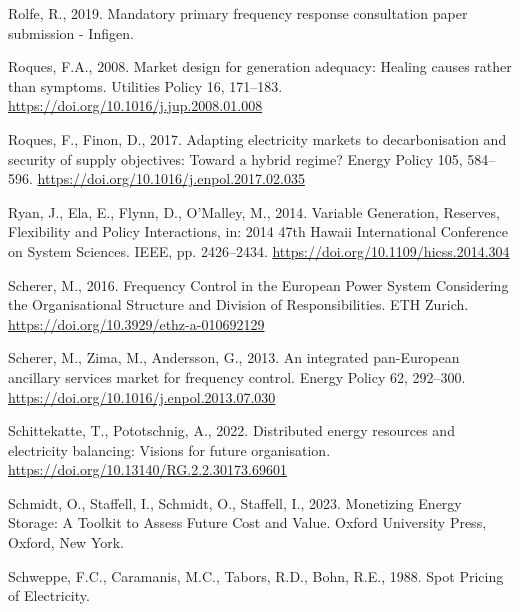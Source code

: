 \documentclass[12pt,a4paper,]{report}
\newlength{\cslhangindent}
\newenvironment{CSLReferences}[2] %
 {%
  \setlength{\parindent}{0pt}
  \ifodd #1 \everypar{\setlength{\hangindent}{\cslhangindent}}\ignorespaces\fi
  \ifnum #2 > 0
  \setlength{\parskip}{#2\baselineskip}
  \fi
 }%
 {}
\begin{document}
\begin{CSLReferences}{1}{0}
\leavevmode{}%
Rolfe, R., 2019. Mandatory primary frequency response consultation paper
submission - {Infigen}.

\leavevmode{}%
Roques, F.A., 2008. Market design for generation adequacy: {Healing}
causes rather than symptoms. Utilities Policy 16, 171--183.
\url{https://doi.org/10.1016/j.jup.2008.01.008}

\leavevmode{}%
Roques, F., Finon, D., 2017. Adapting electricity markets to
decarbonisation and security of supply objectives: {Toward} a hybrid
regime? Energy Policy 105, 584--596.
\url{https://doi.org/10.1016/j.enpol.2017.02.035}

\leavevmode{}%
Ryan, J., Ela, E., Flynn, D., O'Malley, M., 2014. Variable {Generation},
{Reserves}, {Flexibility} and {Policy Interactions}, in: 2014 47th
{Hawaii International Conference} on {System Sciences}. {IEEE}, pp.
2426--2434. \url{https://doi.org/10.1109/hicss.2014.304}

\leavevmode{}%
Scherer, M., 2016. Frequency {Control} in the {European Power System
Considering} the {Organisational Structure} and {Division} of
{Responsibilities}. {ETH Zurich}.
\url{https://doi.org/10.3929/ethz-a-010692129}

\leavevmode{}%
Scherer, M., Zima, M., Andersson, G., 2013. An integrated pan-{European}
ancillary services market for frequency control. Energy Policy 62,
292--300. \url{https://doi.org/10.1016/j.enpol.2013.07.030}

\leavevmode{}%
Schittekatte, T., Pototschnig, A., 2022. Distributed energy resources
and electricity balancing: Visions for future organisation.
\url{https://doi.org/10.13140/RG.2.2.30173.69601}

\leavevmode{}%
Schmidt, O., Staffell, I., Schmidt, O., Staffell, I., 2023. Monetizing
{Energy Storage}: {A Toolkit} to {Assess Future Cost} and {Value}.
{Oxford University Press}, {Oxford, New York}.

\leavevmode{}%
Schweppe, F.C., Caramanis, M.C., Tabors, R.D., Bohn, R.E., 1988. Spot
{Pricing} of {Electricity}.


\end{CSLReferences}
\end{document}

